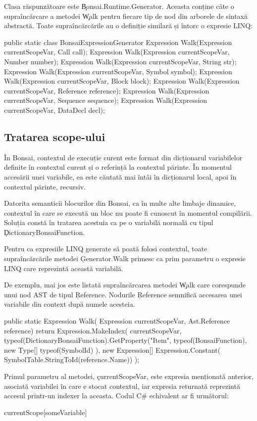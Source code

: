 \documentclass[12pt,a4paper]{memoir}
\begin{document}
Clasa răspunzătoare este \c{Bonsai.Runtime.Generator}. Aceasta conține câte o supraîncărcare a metodei \c{Walk} pentru fiecare tip de nod din arborele de sintaxă abstractă. Toate supraîncărcările au o definiție similară și întorc o expresie LINQ:
\begin{code}
public static class BonsaiExpressionGenerator {
  Expression Walk(Expression currentScopeVar, Call call);       
  Expression Walk(Expression currentScopeVar, Number number);
  Expression Walk(Expression currentScopeVar, String str);
  Expression Walk(Expression currentScopeVar, Symbol symbol);
  Expression Walk(Expression currentScopeVar, Block block);
  Expression Walk(Expression currentScopeVar, Reference reference);
  Expression Walk(Expression currentScopeVar, Sequence sequence);
  Expression Walk(Expression currentScopeVar, DataDecl decl);
}
\end{code}

\subsection{Tratarea scope-ului}\label{sec:ScopeManagement}

În Bonsai, contextul de execuție curent este format din dicționarul variabilelor definite în contextul curent și o referință la contextul părinte. În momentul accesării unei variabile, ea este căutată mai întâi în dicționarul local, apoi în contextul părinte, recursiv.

Datorita semanticii blocurilor din Bonsai, ca în multe alte limbaje dinamice, contextul în care se execută un bloc nu poate fi cunoscut în momentul compilării. Soluția constă în tratarea acestuia ca pe o variabilă normală cu tipul \c{DictionaryBonsaiFunction}. 

Pentru ca expresiile LINQ generate să poată folosi contextul, toate supraîncărcările metodei \c{Generator.Walk} primesc ca prim parametru o expresie LINQ care reprezintă această variabilă.

De exemplu, mai jos este listată supraîncărcarea metodei \c{Walk} care corespunde unui nod AST de tipul \c{Reference}. Nodurile \c{Reference} semnifică accesarea unei variabile din context după numele acesteia. 
\begin{code}
public static Expression Walk(
    Expression currentScopeVar,
    Ast.Reference reference)
{
    return Expression.MakeIndex(
        currentScopeVar,
        typeof(DictionaryBonsaiFunction).GetProperty("Item", 
            typeof(BonsaiFunction), new Type[] { typeof(SymbolId) }), 
        new Expression[] { Expression.Constant(
            SymbolTable.StringToId(reference.Name)) });
}
\end{code}
Primul parametru al metodei, \c{currentScopeVar}, este expresia menționată anterior, asociată variabilei în care e stocat contextul, iar expresia returnată reprezintă accesul printr-un indexer la aceasta. Codul C\# echivalent ar fi următorul:
\begin{code}
currentScope[someVariable]
\end{code}
\end{document}
